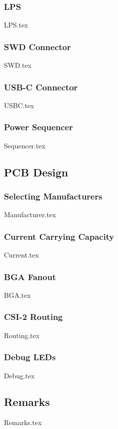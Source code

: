     \subsubsection{LPS}\label{sec:schematic-ldos}
        {LPS.tex}

    \subsubsection{SWD Connector}\label{sec:schematic-tag}
        {SWD.tex}

    \subsubsection{USB-C Connector}\label{sec:schematic-usbc}
        {USBC.tex}

    \subsubsection{Power Sequencer}
        {Sequencer.tex}

\subsection{PCB Design} \label{sec:v0-pcb}

\subsubsection{Selecting Manufacturers}
    {Manufacturer.tex}

\subsubsection{Current Carrying Capacity}
    {Current.tex}

\subsubsection{BGA Fanout}
    {BGA.tex}

\subsubsection{CSI-2 Routing}
    {Routing.tex}

\subsubsection{Debug LEDs}
    {Debug.tex}

\subsection{Remarks}
    {Remarks.tex}
